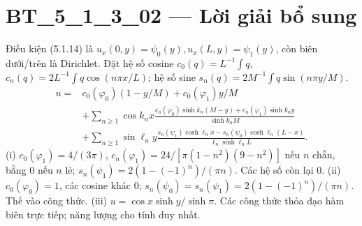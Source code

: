 \documentclass[10pt,a4paper]{article}
\begin{document}
\section*{BT\_5\_1\_3\_02 — Lời giải bổ sung}
Điều kiện (5.1.14) là $u_x(0,y)=\psi_0(y),u_x(L,y)=\psi_1(y)$, còn biên dưới/trên là Dirichlet. Đặt hệ số cosine $c_0(q)=L^{-1}\int q$, $c_n(q)=2L^{-1}\int q\cos(n\pi x/L)$; hệ số sine $s_n(q)=2M^{-1}\int q\sin(n\pi y/M)$.
\begin{align*}
u={}&c_0(\varphi_0)(1-y/M)+c_0(\varphi_1)y/M\\
&+\sum_{n\ge1}\cos k_nx\frac{c_n(\varphi_0)\sinh k_n(M-y)+c_n(\varphi_1)\sinh k_ny}{\sinh k_nM}\\
&+\sum_{n\ge1}\sin\ell_ny\frac{s_n(\psi_1)\cosh\ell_nx-s_n(\psi_0)\cosh\ell_n(L-x)}{\ell_n\sinh\ell_nL}.
\end{align*}
(i) $c_0(\varphi_1)=4/(3\pi)$, $c_n(\varphi_1)=24/[\pi(1-n^2)(9-n^2)]$ nếu $n$ chẵn, bằng 0 nếu $n$ lẻ; $s_n(\psi_1)=2(1-(-1)^n)/(\pi n)$. Các hệ số còn lại 0.
(ii) $c_0(\varphi_0)=1$, các cosine khác 0; $s_n(\psi_0)=s_n(\psi_1)=2(1-(-1)^n)/(\pi n)$. Thế vào công thức.
(iii) $u=\cos x\sinh y/\sinh\pi$. Các công thức thỏa đạo hàm biên trực tiếp; năng lượng cho tính duy nhất.
\end{document}
